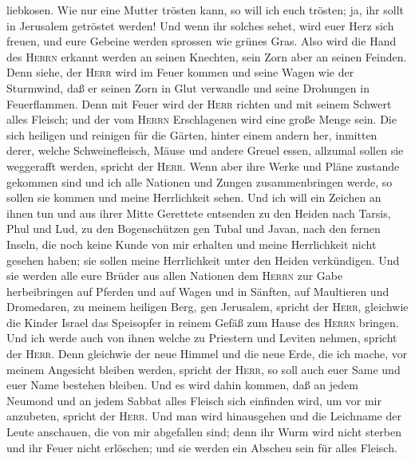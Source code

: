 liebkosen.  Wie nur eine Mutter trösten kann, so will ich
euch trösten; ja, ihr sollt in Jerusalem getröstet werden!
 Und wenn ihr solches sehet, wird euer Herz sich freuen,
und eure Gebeine werden sprossen wie grünes Gras. Also wird die Hand des
\textsc{Herrn} erkannt werden an seinen Knechten, sein Zorn aber an
seinen Feinden.  Denn siehe, der \textsc{Herr} wird im
Feuer kommen und seine Wagen wie der Sturmwind, daß er seinen Zorn in
Glut verwandle und seine Drohungen in Feuerflammen.  Denn
mit Feuer wird der \textsc{Herr} richten und mit seinem Schwert alles
Fleisch; und der vom \textsc{Herrn} Erschlagenen wird eine große Menge
sein.  Die sich heiligen und reinigen für die Gärten,
hinter einem andern her, inmitten derer, welche Schweinefleisch, Mäuse
und andere Greuel essen, allzumal sollen sie weggerafft werden, spricht
der \textsc{Herr}.  Wenn aber ihre Werke und Pläne
zustande gekommen sind und ich alle Nationen und Zungen zusammenbringen
werde, so sollen sie kommen und meine Herrlichkeit sehen.
 Und ich will ein Zeichen an ihnen tun und aus ihrer
Mitte Gerettete entsenden zu den Heiden nach Tarsis, Phul und Lud, zu
den Bogenschützen gen Tubal und Javan, nach den fernen Inseln, die noch
keine Kunde von mir erhalten und meine Herrlichkeit nicht gesehen haben;
sie sollen meine Herrlichkeit unter den Heiden verkündigen.
 Und sie werden alle eure Brüder aus allen Nationen dem
\textsc{Herrn} zur Gabe herbeibringen auf Pferden und auf Wagen und in
Sänften, auf Maultieren und Dromedaren, zu meinem heiligen Berg, gen
Jerusalem, spricht der \textsc{Herr}, gleichwie die Kinder Israel das
Speisopfer in reinem Gefäß zum Hause des \textsc{Herrn} bringen.
 Und ich werde auch von ihnen welche zu Priestern und
Leviten nehmen, spricht der \textsc{Herr}.  Denn
gleichwie der neue Himmel und die neue Erde, die ich mache, vor meinem
Angesicht bleiben werden, spricht der \textsc{Herr}, so soll auch euer
Same und euer Name bestehen bleiben.  Und es wird dahin
kommen, daß an jedem Neumond und an jedem Sabbat alles Fleisch sich
einfinden wird, um vor mir anzubeten, spricht der \textsc{Herr}.
 Und man wird hinausgehen und die Leichname der Leute
anschauen, die von mir abgefallen sind; denn ihr Wurm wird nicht sterben
und ihr Feuer nicht erlöschen; und sie werden ein Abscheu sein für alles
Fleisch.

